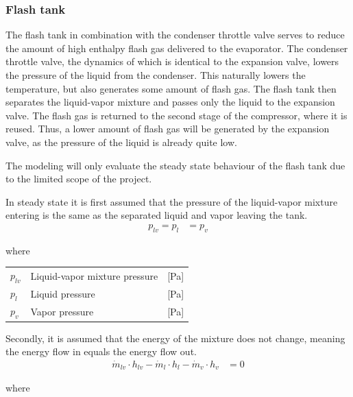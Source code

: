 \subsubsection{Flash tank}
The flash tank in combination with the condenser throttle valve serves to reduce the amount of high enthalpy flash gas delivered to the evaporator. The condenser throttle valve, the dynamics of which is identical to the expansion valve, lowers the pressure of the liquid from the condenser. This naturally lowers the temperature, but also generates some amount of flash gas. The flash tank then separates the liquid-vapor mixture and passes only the liquid to the expansion valve. The flash gas is returned to the second stage of the compressor, where it is reused. Thus, a lower amount of flash gas will be generated by the expansion valve, as the pressure of the liquid is already quite low.

The modeling will only evaluate the steady state behaviour of the flash tank due to the limited scope of the project. 

In steady state it is first assumed that the pressure of the liquid-vapor mixture entering is the same as the separated liquid and vapor leaving the tank. 
\begin{align}
	p_{lv} 	= p_{l}					&  = p_{v} 
	\label{eq:Flash_tank_pressure}
\end{align}

where 

\begin{center}
	\begin{tabular}{l p{8cm} l}
		$p_{lv}$				&  Liquid-vapor mixture pressure		& [\si{Pa}]\\
		$p_{l}$					&  Liquid pressure 						& [\si{Pa}] \\
		$p_{v}$					&  Vapor pressure						& [\si{Pa}]\\
		
	\end{tabular}
\end{center}


Secondly, it is assumed that the energy of the mixture does not change, meaning the energy flow in equals the energy flow out. 
\begin{align}
	\dot{m}_{lv} \cdot  h_{lv}  - \dot{m}_{l} \cdot  h_{l} - \dot{m}_{v} \cdot  h_{v} & = 0
	\label{eq:Flash_tank_energyflow} 
\end{align}

where 


